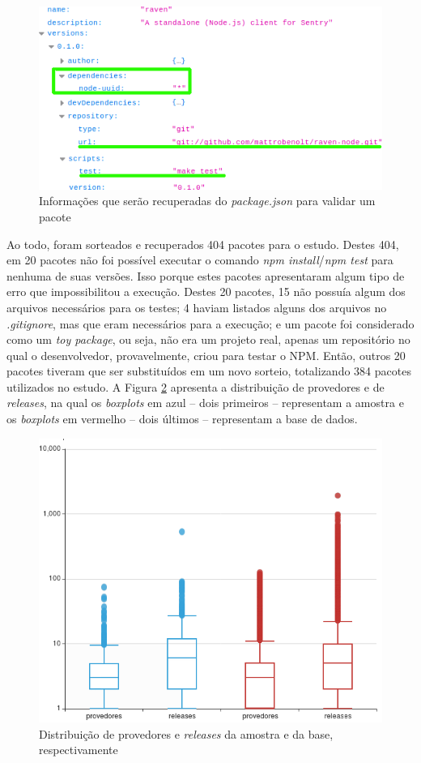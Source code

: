 \begin{figure}
    \centering
    \includegraphics[scale=0.7]{figuras/package_json.png}
    \caption{Informações que serão recuperadas do \textit{package.json} para validar um pacote}
    \label{fig:package_json}
\end{figure}{}

Ao todo, foram sorteados e recuperados 404 pacotes para o estudo. Destes 404, em 20 pacotes não foi possível executar o comando \textit{npm install}/\textit{npm test} para nenhuma de suas versões. Isso porque estes pacotes apresentaram algum tipo de erro que impossibilitou a execução. Destes 20 pacotes, 15 não possuía algum dos arquivos necessários para os testes; 4 haviam listados alguns dos arquivos no \textit{.gitignore}, mas que eram necessários para a execução; e um pacote foi considerado como um \textit{toy package}, ou seja, não era um projeto real, apenas um repositório no qual o desenvolvedor, provavelmente, criou para testar o \gls{NPM}. Então, outros 20 pacotes tiveram que ser substituídos em um novo sorteio, totalizando 384 pacotes utilizados no estudo. A Figura \ref{fig:database} apresenta a distribuição de provedores e de \textit{releases}, na qual os \textit{boxplots} em azul -- dois primeiros -- representam a amostra e os \textit{boxplots} em vermelho -- dois últimos -- representam a base de dados.

\begin{figure}
    \centering
    \includegraphics[scale=0.6]{figuras/data_box_plot_pt.png}
    \caption{Distribuição de provedores e \textit{releases} da amostra e da base, respectivamente}
    \label{fig:database}
\end{figure}{}